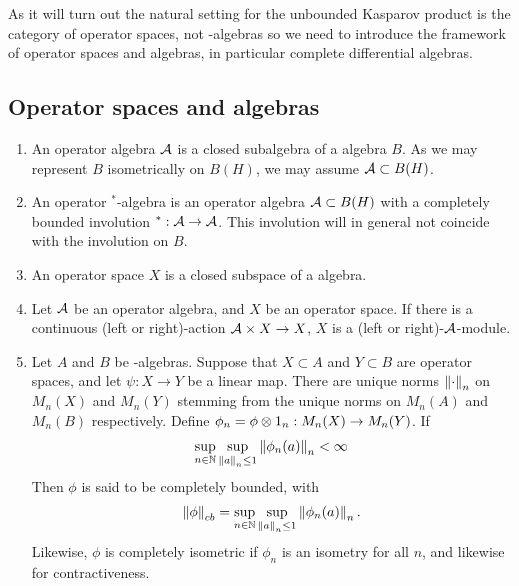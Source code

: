 As it will turn out the natural setting for the unbounded Kasparov product is the category of operator spaces, not \Cstar-algebras so we need to introduce the framework of operator spaces and algebras, in particular complete differential algebras.
\subsection{Operator spaces and algebras}
\begin{definition}
\begin{enumerate}
\item 
	An operator algebra $\mathcal{A}$ is a closed subalgebra of a \Cstar algebra $B$. As we may represent $B$ isometrically on $B(H)$, we may assume $\mathcal{A}\subset B(H)$. 
\item
	An operator $^*$-algebra is an operator algebra $\mathcal{A}\subset B(H)$ with a completely bounded involution $^*:\mathcal{A}\to \mathcal{A}$. This involution will in general not coincide with the involution on $B$.
\item	
	An operator space $X$ is a closed subspace of a \Cstar algebra.
\item 
	Let $\mathcal{A}$ be an operator algebra, and $X$ be an operator space. If there is a continuous (left or right)-action $\mathcal{A}\times X\to X$, $X$ is a (left or right)-$\mathcal{A}$-module. 
\item
	Let $A$ and $B$ be \Cstar-algebras. Suppose that $X\subset A$ and $Y\subset B$ are operator spaces, and let $\psi:X\to Y$ be a linear map. There are unique norms $\left \Vert \cdot \right \Vert_n$ on $M_n(X)$ and $M_n(Y)$ stemming from the unique norms on $M_n(A)$ and $M_n(B)$ respectively. 
	Define $\phi_n=\phi \tens 1_n:M_n(X)\to M_n(Y)$. If 
	\begin{align*}
		\sup_{n\in \N} \sup_{\norm{a}_n\leq 1}\norm{\phi_n(a)}_{n}<\infty
	\end{align*}
	Then $\phi$ is said to be completely bounded, with 
	\begin{align*} 
		\norm{\phi}_{cb}=	\sup_{n\in \N} \sup_{\norm{a}_n\leq 1}\norm{\phi_n(a)}_{n}. 
	\end{align*} 
	Likewise, $\phi$ is completely isometric if $\phi_n$ is an isometry for all $n$, and likewise for contractiveness. 
\end{enumerate}
\end{definition}



